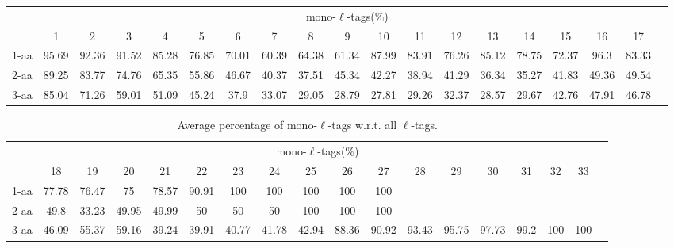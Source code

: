 \documentclass{article}
\begin{document}
\begin{landscape}

\begin{table}[h]\tiny
\vspace{3mm}
{\centering
\begin{center}
\begin{tabular}{|l|c|c|c|c|c|c|c|c|c|c|c|c|c|c|c|c|c|c|}
  \hline
  & \multicolumn{ 17 }{|c|}{mono-$\ell$-tags(\%)} \\
  \cline{2- 18}
    & 1 & 2 & 3 & 4 & 5 & 6 & 7 & 8 & 9 & 10 & 11 & 12 & 13 & 14 & 15 & 16 & 17\\
  \hline
1-aa  & 95.69 & 92.36 & 91.52 & 85.28 & 76.85 & 70.01 & 60.39 & 64.38 & 61.34 & 87.99 & 83.91 & 76.26 & 85.12 & 78.75 & 72.37 & 96.3 & 83.33\\
2-aa  & 89.25 & 83.77 & 74.76 & 65.35 & 55.86 & 46.67 & 40.37 & 37.51 & 45.34 & 42.27 & 38.94 & 41.29 & 36.34 & 35.27 & 41.83 & 49.36 & 49.54\\
3-aa  & 85.04 & 71.26 & 59.01 & 51.09 & 45.24 & 37.9 & 33.07 & 29.05 & 28.79 & 27.81 & 29.26 & 32.37 & 28.57 & 29.67 & 42.76 & 47.91 & 46.78\\
 \hline
\end{tabular}
\end{center}
\par}
\centering

\vspace{3mm}
\end{table}
\begin{table}[h]\tiny
\vspace{3mm}
{\centering
\begin{center}
\begin{tabular}{|l|c|c|c|c|c|c|c|c|c|c|c|c|c|c|c|c|c|}
  \hline
  & \multicolumn{ 16 }{|c|}{mono-$\ell$-tags(\%)} \\
  \cline{2- 17}
    & 18 & 19 & 20 & 21 & 22 & 23 & 24 & 25 & 26 & 27 & 28 & 29 & 30 & 31 & 32 & 33\\
  \hline
1-aa  & 77.78 & 76.47 & 75 & 78.57 & 90.91 & 100 & 100 & 100 & 100 & 100 &  &  &  &  &  & \\
2-aa  & 49.8 & 33.23 & 49.95 & 49.99 & 50 & 50 & 50 & 100 & 100 & 100 &  &  &  &  &  & \\
3-aa  & 46.09 & 55.37 & 59.16 & 39.24 & 39.91 & 40.77 & 41.78 & 42.94 & 88.36 & 90.92 & 93.43 & 95.75 & 97.73 & 99.2 & 100 & 100\\
 \hline
\end{tabular}
\end{center}
\par}
\centering

\caption{ Average percentage of mono-$\ell$-tags w.r.t. all $\ell$-tags.}
\label{table:table7}

\vspace{3mm}
\end{table}
\end{landscape}
\end{document}

